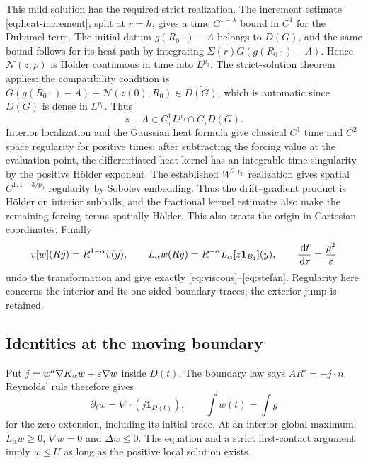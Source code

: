 This mild solution has the required strict realization. The increment
estimate \eqref{eq:heat-increment}, split at $r=h$, gives a time
$C^{1-\lambda}$ bound in $C^1$ for the Duhamel term. The initial datum
$g(R_0\cdot)-A$ belongs to $D(G)$, and the same bound follows for its heat
path by integrating $\Sigma(r)G(g(R_0\cdot)-A)$. Hence
$\mathcal N(z,\rho)$ is H\"older continuous in time into $L^{p_0}$.
The strict-solution theorem \cite[Theorem~4.2.6(ii)]{Lunardi2004} applies:
the compatibility condition is
$G(g(R_0\cdot)-A)+\mathcal N(z(0),R_0)\in\overline{D(G)}$,
which is automatic since $D(G)$ is dense in $L^{p_0}$. Thus
\[
 z-A\in C^1_\tau L^{p_0}\cap C_\tau D(G).
\]
Interior localization and the Gaussian heat formula give classical
$C^1$ time and $C^2$ space regularity for positive times: after subtracting
the forcing value at the evaluation point, the differentiated heat kernel
has an integrable time singularity by the positive H\"older exponent.
The established $W^{2,p_0}$ realization gives spatial
$C^{1,1-3/p_0}$ regularity by Sobolev embedding. Thus the drift--gradient
product is H\"older on interior subballs, and the fractional kernel
estimates also make the remaining forcing terms spatially H\"older.
This also treats the origin in Cartesian
coordinates. Finally
\[
 v[w](Ry)=R^{1-\alpha}\widetilde v(y),\qquad
 L_\alpha w(Ry)=R^{-\alpha}L_\alpha[z\mathbf1_{B_1}](y),
 \qquad \frac{\,\mathrm d t}{\,\mathrm d\tau}=\frac{\rho^2}{\varepsilon}
\]
undo the transformation and give exactly
\eqref{eq:viscous}--\eqref{eq:stefan}. Regularity here concerns the interior
and its one-sided boundary traces; the exterior jump is retained.

\subsection{Identities at the moving boundary}

Put $j=w^a\nabla K_\alpha w+\varepsilon\nabla w$ inside $D(t)$.
The boundary law says $AR'=-j\cdot n$. Reynolds' rule therefore gives
\begin{equation}\label{eq:extended-mass}
 \partial_tw=\nabla\cdot(j\mathbf1_{D(t)}),\qquad
 \int w(t)=\int g
\end{equation}
for the zero extension, including its initial trace. At an interior global
maximum, $L_\alpha w\geq0$, $\nabla w=0$ and $\Delta w\leq0$.
The equation and a strict first-contact argument imply $w\leq U$ as long
as the positive local solution exists.

